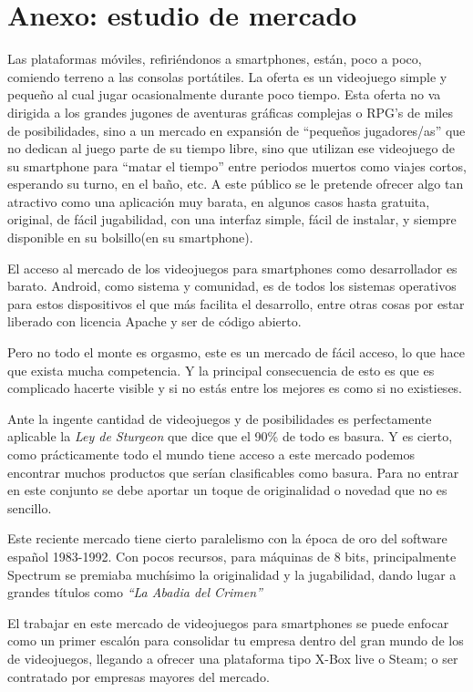 \documentclass[12 pt, a4paper, twoside]{article}
\begin{document}
\section{Anexo: estudio de mercado}
Las plataformas móviles, refiriéndonos a smartphones, están, poco a
poco, comiendo terreno a las consolas portátiles. La oferta es un
videojuego simple y pequeño al cual jugar ocasionalmente durante
poco tiempo. Esta oferta no va dirigida a los grandes jugones de
aventuras gráficas complejas o RPG's de miles de posibilidades, sino a un
mercado en expansión de ``pequeños jugadores/as'' que no dedican al
juego parte de su tiempo libre, sino que utilizan ese videojuego de su
smartphone  para ``matar el tiempo'' entre periodos muertos como
viajes cortos, esperando su turno, en el baño, etc. A este público se
le pretende ofrecer algo tan atractivo como una aplicación muy barata, en
algunos casos hasta gratuita, original, de fácil jugabilidad, con una
interfaz simple, fácil de instalar, y siempre disponible en su bolsillo(en su smartphone).

El acceso al mercado de los videojuegos para smartphones como
desarrollador es barato. Android, como sistema y comunidad, es de
todos los sistemas operativos para estos dispositivos el que más
facilita el desarrollo, entre otras cosas por estar liberado con
licencia Apache y ser de código abierto.

Pero no todo el monte es orgasmo, este es un mercado de fácil acceso,
lo que hace que exista mucha competencia. Y la principal consecuencia
de esto es que es complicado hacerte visible y si no estás entre los
mejores es como si no existieses.

Ante la ingente cantidad de videojuegos y de posibilidades es
perfectamente aplicable la \emph{Ley de Sturgeon} que dice que el 90\%
de todo es basura. Y es cierto, como prácticamente todo el mundo tiene
acceso a este mercado podemos encontrar muchos productos que serían
clasificables como basura. Para no entrar en este conjunto se debe
aportar un toque de originalidad o novedad que no es sencillo.

Este reciente mercado tiene cierto paralelismo con la época de oro del
software español 1983-1992. Con pocos recursos, para máquinas de 8
bits, principalmente Spectrum se premiaba muchísimo la originalidad y
la jugabilidad, dando lugar a grandes títulos como \emph{``La Abadia
  del Crimen''}

El trabajar en este mercado de videojuegos para smartphones se puede
enfocar como un primer escalón para consolidar tu empresa dentro del
gran mundo de los de videojuegos, llegando a ofrecer una plataforma
tipo X-Box live o Steam; o ser contratado por empresas mayores del mercado.
\end{document}
